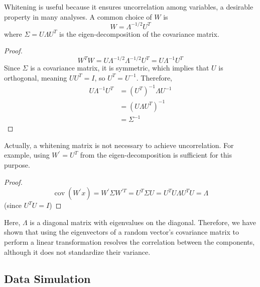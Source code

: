 \documentclass[12pt]{article}
\begin{document}
Whitening is useful because it ensures uncorrelation among variables, a desirable property in many analyses. A common choice of \( W \) is
\[
  W=\Lambda^{-1 / 2} U^T
\]
where \( \Sigma=U \Lambda U^T \) is the eigen-decomposition of the covariance matrix. 

\begin{proof}
  \[
    W^T W=U \Lambda^{-1 / 2} \Lambda^{-1 / 2} U^T=U \Lambda^{-1} U^T
  \]
  Since \( \Sigma \) is a covariance matrix, it is symmetric, which implies that \( U \) is orthogonal, meaning \( U U^T = I \), so \( U^T = U^{-1} \). Therefore,
  \[
    \begin{aligned}
      U \Lambda^{-1} U^T & = \left(U^T\right)^{-1} \Lambda U^{-1} \\
                                                        & = \left(U \Lambda U^T\right)^{-1} \\
                                                        & = \Sigma^{-1}
  \end{aligned}
  \]
\end{proof}

Actually, a whitening matrix is not necessary to achieve uncorrelation. For example, using \( W^{\prime} = U^T \) from the eigen-decomposition is sufficient for this purpose.

\begin{proof}
  \[
    \operatorname{cov}\left(W^{\prime} x\right)=W^{\prime} \Sigma W^{\prime T}=U^T \Sigma U=U^T U \Lambda U^T U=\Lambda
  \]
  (since \( U^T U=I \))
\end{proof}

Here, \( \Lambda \) is a diagonal matrix with eigenvalues on the diagonal. Therefore, we have shown that using the eigenvectors of a random vector's covariance matrix to perform a linear transformation resolves the correlation between the components, although it does not standardize their variance.




\subsection*{Data Simulation}
\end{document}
